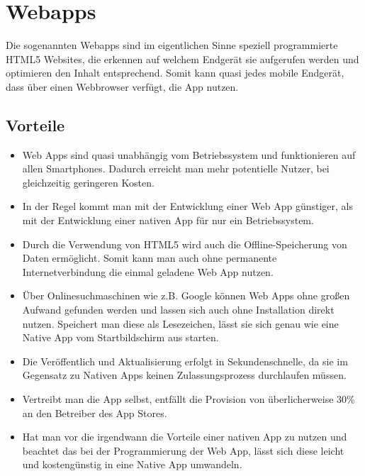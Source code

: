 \section{Webapps}
\label{sec:intro:webapp}

Die sogenannten Webapps sind im eigentlichen Sinne speziell programmierte \ac{HTML5} Websites, die erkennen auf welchem Endgerät sie aufgerufen werden und optimieren den Inhalt entsprechend. Somit kann quasi jedes mobile Endgerät, dass über einen Webbrowser verfügt, die App nutzen.

\subsection{Vorteile}
\label{sec:webapp:pros}

\begin{itemize}

	\item Web Apps sind quasi unabhängig vom Betriebssystem und funktionieren auf allen Smartphones. Dadurch erreicht man mehr potentielle Nutzer, bei gleichzeitig geringeren Kosten.\cite[]{WEB:APPEV:2014}

	\item In der Regel kommt man mit der Entwicklung einer Web App günstiger, als mit der Entwicklung einer nativen App für nur ein Betriebssystem.\cite[]{WEB:APPEV:2014}

	\item Durch die Verwendung von HTML5 wird auch die Offline-Speicherung von Daten ermöglicht. Somit kann man auch ohne permanente Internetverbindung die einmal geladene Web App nutzen.\cite[]{WEB:APPEV:2014}

	\item Über Onlinesuchmaschinen wie z.B. Google können Web Apps ohne großen Aufwand gefunden werden und lassen sich auch ohne Installation direkt nutzen. Speichert man diese als Lesezeichen, lässt sie sich genau wie eine Native App vom Startbildschirm aus starten.\cite[]{WEB:APPEV:2014}

	\item Die Veröffentlich und Aktualisierung erfolgt in Sekundenschnelle, da sie im Gegensatz zu Nativen Apps keinen Zulassungsprozess durchlaufen müssen.\cite[]{WEB:APPEV:2014}

	\item Vertreibt man die App selbst, entfällt die Provision von überlicherweise 30\% an den Betreiber des App Stores.\cite[]{WEB:APPEV:2014}

	\item Hat man vor die irgendwann die Vorteile einer nativen App zu nutzen und beachtet das bei der Programmierung der Web App, lässt sich diese leicht und kostengünstig in eine Native App umwandeln.\cite[]{WEB:APPEV:2014}

\end{itemize}


